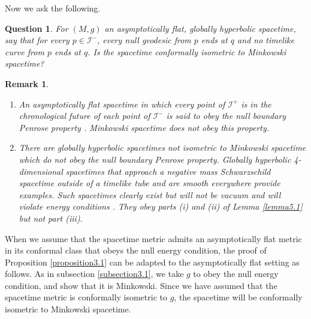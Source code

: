 \documentclass[12pt]{amsart}
\numberwithin{equation}{section}
\newtheorem{remark}[theorem]{Remark}
\newtheorem{question}[theorem]{Question}
\begin{document}

Now we ask the following.

\begin{question}\label{question5.2}
For $(M,g)$ an asymptotically flat, globally hyperbolic spacetime, say that for every $p\in{\mathcal I}^-$, every null geodesic from $p$ ends at $q$ and no timelike curve from $p$ ends at $q$. Is the spacetime conformally isometric to Minkowski spacetime?
\end{question}

\begin{remark}\label{remark5.3} \
\begin{enumerate}
\item An asymptotically flat spacetime in which every point of ${\mathcal I}^+$ is in the chronological future of each point of ${\mathcal I}^-$ is said to obey the \emph{null boundary Penrose property} \cite{CD}. Minkowski spacetime does not obey this property.
\item There are globally hyperbolic spacetimes not isometric to Minkowski spacetime which do not obey the null boundary Penrose property. Globally hyperbolic 4-dimensional spacetimes that approach a negative mass Schwarzschild spacetime outside of a timelike tube and are smooth everywhere provide examples. Such spacetimes clearly exist but will not be vacuum and will violate energy conditions \cite{PSW}. They obey parts (i) and (ii) of Lemma \ref{lemma5.1} but not part (iii).
\end{enumerate}
\end{remark}

When we assume that the spacetime metric admits an asymptotically flat metric in its conformal class that obeys the null energy condition, the proof of Proposition \ref{proposition3.1} can be adapted to the asymptotically flat setting as follows. As in subsection \ref{subsection3.1}, we take $g$ to obey the null energy condition, and show that it is Minkowski. Since we have assumed that the spacetime metric is conformally isometric to $g$, the spacetime will be conformally isometric to Minkowski spacetime.
\end{document}
